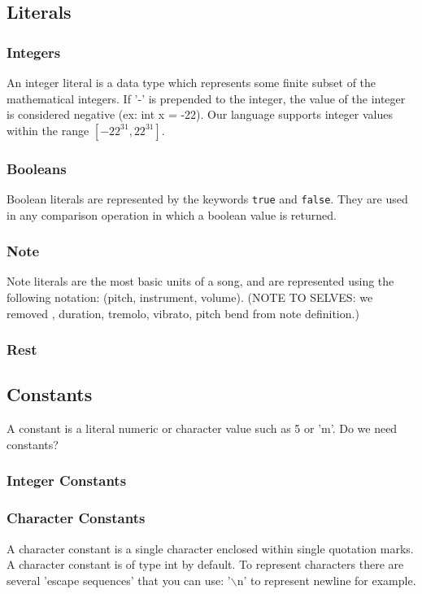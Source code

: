 \documentclass[letterpaper]{article}
\begin{document}
\subsection{Literals}
\subsubsection{Integers}
An integer literal is a data type which represents some finite subset of the mathematical integers. If '-' is prepended to the integer, the value of the integer is considered negative (ex: int x = -22). Our language supports integer values within the range $[-22^{31}, 22^{31}]$.
\subsubsection{Booleans}
Boolean literals are represented by the keywords \texttt{true} and \texttt{false}. They are used in any comparison operation in which a boolean value is returned.
\subsubsection{Note}
Note literals are the most basic units of a song, and are represented using the following notation: (pitch, instrument, volume). (NOTE TO SELVES: we removed , duration, tremolo, vibrato, pitch bend from note definition.)
\subsubsection{Rest}
\subsection{Constants}
A constant is a literal numeric or character value such as 5 or 'm'.
Do we need constants?
\subsubsection{Integer Constants}
\subsubsection{Character Constants}
A character constant is a single character enclosed within single quotation marks. A character constant is of type int by default. To represent characters there are several 'escape sequences' that you can use: '$\backslash$n' to represent newline for example. 
\end{document}
